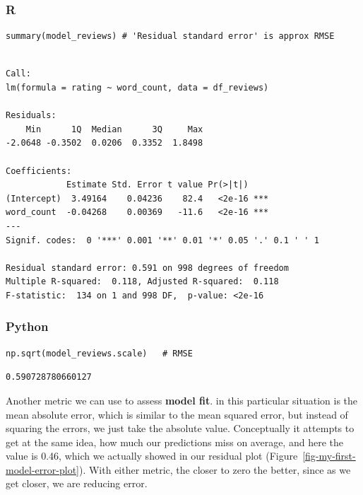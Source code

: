 \documentclass[
  letterpaper,
]{krantz}
\begin{document}
\subsubsection{R}

\begin{verbatim}
summary(model_reviews) # 'Residual standard error' is approx RMSE
\end{verbatim}

\begin{verbatim}

Call:
lm(formula = rating ~ word_count, data = df_reviews)

Residuals:
    Min      1Q  Median      3Q     Max 
-2.0648 -0.3502  0.0206  0.3352  1.8498 

Coefficients:
            Estimate Std. Error t value Pr(>|t|)    
(Intercept)  3.49164    0.04236    82.4   <2e-16 ***
word_count  -0.04268    0.00369   -11.6   <2e-16 ***
---
Signif. codes:  0 '***' 0.001 '**' 0.01 '*' 0.05 '.' 0.1 ' ' 1

Residual standard error: 0.591 on 998 degrees of freedom
Multiple R-squared:  0.118, Adjusted R-squared:  0.118 
F-statistic:  134 on 1 and 998 DF,  p-value: <2e-16
\end{verbatim}

\subsubsection{Python}

\begin{verbatim}
np.sqrt(model_reviews.scale)   # RMSE
\end{verbatim}

\begin{verbatim}
0.590728780660127
\end{verbatim}

Another metric we can use to assess \textbf{model fit}. in this
particular situation is the mean absolute error, which is similar to the
mean squared error, but instead of squaring the errors, we just take the
absolute value. Conceptually it attempts to get at the same idea, how
much our predictions miss on average, and here the value is 0.46, which
we actually showed in our residual plot
(Figure~\ref{fig-my-first-model-error-plot}). With either metric, the
closer to zero the better, since as we get closer, we are reducing
error.
\end{document}

